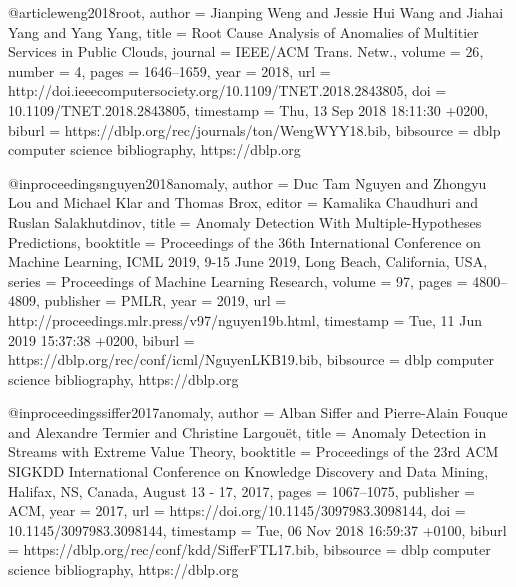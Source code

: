 @article{weng2018root,
  author    = {Jianping Weng and
               Jessie Hui Wang and
               Jiahai Yang and
               Yang Yang},
  title     = {Root Cause Analysis of Anomalies of Multitier Services in Public Clouds},
  journal   = {{IEEE/ACM} Trans. Netw.},
  volume    = {26},
  number    = {4},
  pages     = {1646--1659},
  year      = {2018},
  url       = {http://doi.ieeecomputersociety.org/10.1109/TNET.2018.2843805},
  doi       = {10.1109/TNET.2018.2843805},
  timestamp = {Thu, 13 Sep 2018 18:11:30 +0200},
  biburl    = {https://dblp.org/rec/journals/ton/WengWYY18.bib},
  bibsource = {dblp computer science bibliography, https://dblp.org}
}



@inproceedings{nguyen2018anomaly,
  author    = {Duc Tam Nguyen and
               Zhongyu Lou and
               Michael Klar and
               Thomas Brox},
  editor    = {Kamalika Chaudhuri and
               Ruslan Salakhutdinov},
  title     = {Anomaly Detection With Multiple-Hypotheses Predictions},
  booktitle = {Proceedings of the 36th International Conference on Machine Learning,
               {ICML} 2019, 9-15 June 2019, Long Beach, California, {USA}},
  series    = {Proceedings of Machine Learning Research},
  volume    = {97},
  pages     = {4800--4809},
  publisher = {{PMLR}},
  year      = {2019},
  url       = {http://proceedings.mlr.press/v97/nguyen19b.html},
  timestamp = {Tue, 11 Jun 2019 15:37:38 +0200},
  biburl    = {https://dblp.org/rec/conf/icml/NguyenLKB19.bib},
  bibsource = {dblp computer science bibliography, https://dblp.org}
}

@inproceedings{siffer2017anomaly,
   author    = {Alban Siffer and
               Pierre{-}Alain Fouque and
               Alexandre Termier and
               Christine Largou{\"{e}}t},
  title     = {Anomaly Detection in Streams with Extreme Value Theory},
  booktitle = {Proceedings of the 23rd {ACM} {SIGKDD} International Conference on
               Knowledge Discovery and Data Mining, Halifax, NS, Canada, August 13
               - 17, 2017},
  pages     = {1067--1075},
  publisher = {{ACM}},
  year      = {2017},
  url       = {https://doi.org/10.1145/3097983.3098144},
  doi       = {10.1145/3097983.3098144},
  timestamp = {Tue, 06 Nov 2018 16:59:37 +0100},
  biburl    = {https://dblp.org/rec/conf/kdd/SifferFTL17.bib},
  bibsource = {dblp computer science bibliography, https://dblp.org}
}

